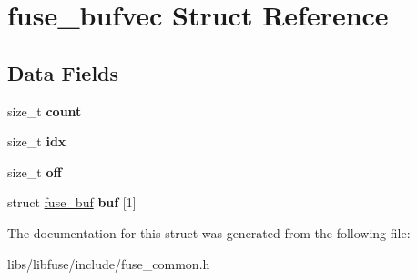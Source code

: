 \hypertarget{structfuse__bufvec}{}\section{fuse\+\_\+bufvec Struct Reference}
\label{structfuse__bufvec}
\subsection*{Data Fields}
\begin{DoxyCompactItemize}
\item 
size\+\_\+t {\bfseries count}\hypertarget{structfuse__bufvec_ac303661a9c39ade1feeb05d8238b4ed6}{}\label{structfuse__bufvec_ac303661a9c39ade1feeb05d8238b4ed6}

\item 
size\+\_\+t {\bfseries idx}\hypertarget{structfuse__bufvec_a41cc18cb303ee16d20b3ae1ebb0ef830}{}\label{structfuse__bufvec_a41cc18cb303ee16d20b3ae1ebb0ef830}

\item 
size\+\_\+t {\bfseries off}\hypertarget{structfuse__bufvec_a0fbb583168d52562f0f848562ecf63bc}{}\label{structfuse__bufvec_a0fbb583168d52562f0f848562ecf63bc}

\item 
struct \hyperlink{structfuse__buf}{fuse\+\_\+buf} {\bfseries buf} \mbox{[}1\mbox{]}\hypertarget{structfuse__bufvec_a754caca61fdf8107d28b510505a033bb}{}\label{structfuse__bufvec_a754caca61fdf8107d28b510505a033bb}

\end{DoxyCompactItemize}


The documentation for this struct was generated from the following file\+:\begin{DoxyCompactItemize}
\item 
libs/libfuse/include/fuse\+\_\+common.\+h\end{DoxyCompactItemize}

